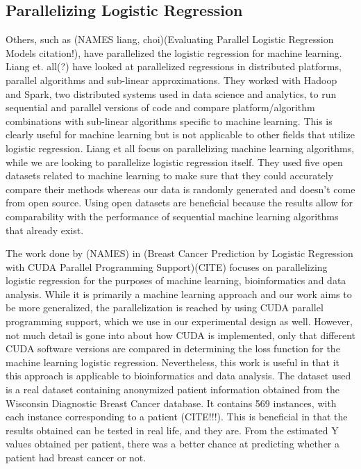 \documentclass[letterpaper, 10 pt, conference]{ieeeconf}  %
\begin{document}
\subsection{Parallelizing Logistic Regression}
Others, such as (NAMES liang, choi)(Evaluating Parallel Logistic Regression Models citation!), have parallelized the logistic regression for machine learning. Liang et. all(?) have looked at parallelized regressions in distributed platforms, parallel algorithms and sub-linear approximations. They worked with Hadoop and Spark, two distributed systems used in data science and analytics, to run sequential and parallel versions of code and compare platform/algorithm combinations with sub-linear algorithms specific to machine learning. This is clearly useful for machine learning but is not applicable to other fields that utilize logistic regression. Liang et all focus on parallelizing machine learning algorithms, while we are looking to parallelize logistic regression itself. They used five open datasets related to machine learning to make sure that they could accurately compare their methods whereas our data is randomly generated and doesn’t come from open source. Using open datasets are beneficial because the results allow for comparability with the performance of sequential machine learning algorithms that already exist. 

The work done by (NAMES) in (Breast Cancer Prediction by Logistic Regression with CUDA Parallel Programming Support)(CITE) focuses on parallelizing logistic regression for the purposes of machine learning, bioinformatics and data analysis. While it is primarily a machine learning approach and our work aims to be more generalized, the parallelization is reached by using CUDA parallel programming support, which we use in our experimental design as well. However, not much detail is gone into about how CUDA is implemented, only that different CUDA software versions are compared in determining the loss function for the machine learning logistic regression. Nevertheless, this work is useful in that it this approach is applicable to bioinformatics and data analysis. The dataset used is a real dataset containing anonymized patient information obtained from the Wisconsin Diagnostic Breast Cancer database. It contains 569 instances, with each instance corresponding to a patient (CITE!!!). This is beneficial in that the results obtained can be tested in real life, and they are. From the estimated Y values obtained per patient, there was a better chance at predicting whether a patient had breast cancer or not.  
\end{document}
